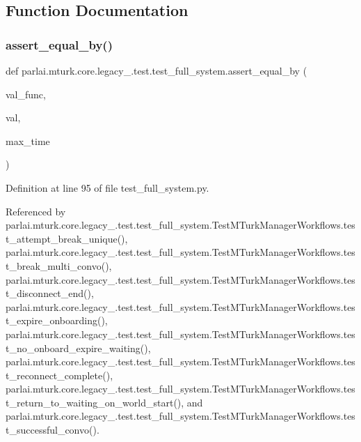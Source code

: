 \subsection{Function Documentation}
\mbox{\label{namespaceparlai_1_1mturk_1_1core_1_1legacy__2018_1_1test_1_1test__full__system_af8faa2b85ee3171cbb14a4ffb6696c91}} 
\subsubsection{\texorpdfstring{assert\+\_\+equal\+\_\+by()}{assert\_equal\_by()}}
{\footnotesize\ttfamily def parlai.\+mturk.\+core.\+legacy\+\_.\+test.\+test\+\_\+full\+\_\+system.\+assert\+\_\+equal\+\_\+by (\begin{DoxyParamCaption}\item[{}]{val\+\_\+func,  }\item[{}]{val,  }\item[{}]{max\+\_\+time }\end{DoxyParamCaption})}



Definition at line 95 of file test\+\_\+full\+\_\+system.\+py.



Referenced by parlai.\+mturk.\+core.\+legacy\+\_.\+test.\+test\+\_\+full\+\_\+system.\+Test\+M\+Turk\+Manager\+Workflows.\+test\+\_\+attempt\+\_\+break\+\_\+unique(), parlai.\+mturk.\+core.\+legacy\+\_.\+test.\+test\+\_\+full\+\_\+system.\+Test\+M\+Turk\+Manager\+Workflows.\+test\+\_\+break\+\_\+multi\+\_\+convo(), parlai.\+mturk.\+core.\+legacy\+\_.\+test.\+test\+\_\+full\+\_\+system.\+Test\+M\+Turk\+Manager\+Workflows.\+test\+\_\+disconnect\+\_\+end(), parlai.\+mturk.\+core.\+legacy\+\_.\+test.\+test\+\_\+full\+\_\+system.\+Test\+M\+Turk\+Manager\+Workflows.\+test\+\_\+expire\+\_\+onboarding(), parlai.\+mturk.\+core.\+legacy\+\_.\+test.\+test\+\_\+full\+\_\+system.\+Test\+M\+Turk\+Manager\+Workflows.\+test\+\_\+no\+\_\+onboard\+\_\+expire\+\_\+waiting(), parlai.\+mturk.\+core.\+legacy\+\_.\+test.\+test\+\_\+full\+\_\+system.\+Test\+M\+Turk\+Manager\+Workflows.\+test\+\_\+reconnect\+\_\+complete(), parlai.\+mturk.\+core.\+legacy\+\_.\+test.\+test\+\_\+full\+\_\+system.\+Test\+M\+Turk\+Manager\+Workflows.\+test\+\_\+return\+\_\+to\+\_\+waiting\+\_\+on\+\_\+world\+\_\+start(), and parlai.\+mturk.\+core.\+legacy\+\_.\+test.\+test\+\_\+full\+\_\+system.\+Test\+M\+Turk\+Manager\+Workflows.\+test\+\_\+successful\+\_\+convo().

